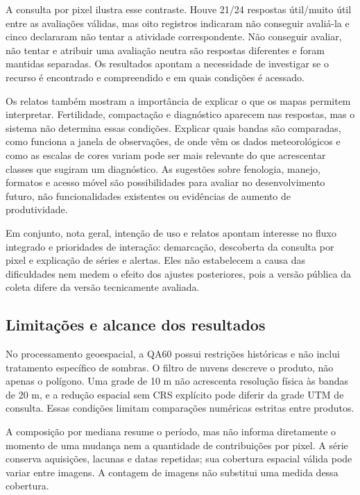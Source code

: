 A consulta por pixel ilustra esse contraste. Houve 21/24 respostas útil/muito útil entre as avaliações válidas, mas oito registros indicaram não conseguir avaliá-la e cinco declararam não tentar a atividade correspondente. Não conseguir avaliar, não tentar e atribuir uma avaliação neutra são respostas diferentes e foram mantidas separadas. Os resultados apontam a necessidade de investigar se o recurso é encontrado e compreendido e em quais condições é acessado.

Os relatos também mostram a importância de explicar o que os mapas permitem interpretar. Fertilidade, compactação e diagnóstico aparecem nas respostas, mas o sistema não determina essas condições. Explicar quais bandas são comparadas, como funciona a janela de observações, de onde vêm os dados meteorológicos e como as escalas de cores variam pode ser mais relevante do que acrescentar classes que sugiram um diagnóstico. As sugestões sobre fenologia, manejo, formatos e acesso móvel são possibilidades para avaliar no desenvolvimento futuro, não funcionalidades existentes ou evidências de aumento de produtividade.

Em conjunto, nota geral, intenção de uso e relatos apontam interesse no fluxo integrado e prioridades de interação: demarcação, descoberta da consulta por pixel e explicação de séries e alertas. Eles não estabelecem a causa das dificuldades nem medem o efeito dos ajustes posteriores, pois a versão pública da coleta difere da versão tecnicamente avaliada.

\subsection{Limitações e alcance dos resultados}

No processamento geoespacial, a QA60 possui restrições históricas e não inclui tratamento específico de sombras. O filtro de nuvens descreve o produto, não apenas o polígono. Uma grade de 10 m não acrescenta resolução física às bandas de 20 m, e a redução espacial sem CRS explícito pode diferir da grade UTM de consulta. Essas condições limitam comparações numéricas estritas entre produtos.

A composição por mediana resume o período, mas não informa diretamente o momento de uma mudança nem a quantidade de contribuições por pixel. A série conserva aquisições, lacunas e datas repetidas; sua cobertura espacial válida pode variar entre imagens. A contagem de imagens não substitui uma medida dessa cobertura.

